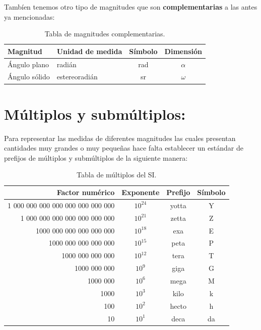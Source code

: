 \documentclass[a5paper,pagesize,10pt,bibtotoc,pointlessnumbers,
normalheadings,DIV=9,fleqn,x11names,table,twoside=false]{scrbook}
\begin{document}
Tambíen tenemos otro tipo de magnitudes que son \textbf{complementarias} a las antes ya mencionadas:

\begin{table}[H]
 \begin{center}
 \begin{tabular}{llcc}
 \hline
Magnitud & Unidad de medida & Símbolo & Dimensión\\
\hline
Ángulo plano & radián & rad & $\alpha$ \\
Ángulo sólido & estereoradián & sr & $\omega$ \\
\hline
 \end{tabular}
 \caption{Tabla de magnitudes complementarias.}
 \end{center}
\end{table}

\section{Múltiplos y submúltiplos:}

Para representar las medidas de diferentes magnitudes las cuales presentan cantidades muy grandes o muy pequeñas hace falta 
establecer un estándar de prefijos de múltiplos y submúltiplos de la siguiente manera:

\begin{table}[H]
 \begin{center}
\begin{tabular}{rccc}
\hline
Factor numérico & Exponente & Prefijo & Símbolo\\
\hline
1 000 000 000 000 000 000 000 000 & $10^{24}$ & yotta & Y \\
1 000 000 000 000 000 000 000 & $10^{21}$ & zetta & Z \\
1000 000 000 000 000 000 & $10^{18}$ & exa & E\\
1000 000 000 000 000 & $10^{15}$ & peta & P\\
1000 000 000 000 & $10^{12}$ & tera & T\\
1000 000 000 & $10^{9}$ & giga & G\\
1000 000 & $10^{6}$ & mega  & M\\
1000 &$10^{3}$ & kilo & k\\
100 & $10^{2}$ & hecto & h\\
10 & $10^{1}$  & deca & da\\
\hline
\end{tabular}
\caption{Tabla de múltiplos del SI.}
 \end{center}
\end{table}
 
\end{document}
